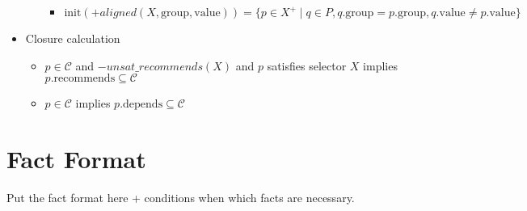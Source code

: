 \documentclass[a4paper,english]{article}
\begin{document}
\begin{itemize}
\begin{itemize}
\begin{itemize}
          \item $\mathrm{init}({+}\mathit{aligned}(X,\mathrm{group},\mathrm{value}))=\{p\in X^{+}\mid q\in P, q.\mathrm{group} = p.\mathrm{group}, q.\mathrm{value} \neq p.\mathrm{value}\}$
        \end{itemize}
    \end{itemize}
  \item Closure calculation
    \begin{itemize}
      \item $p\in \mathcal{C}$ and ${-}\mathit{unsat\_recommends}(X)$ and $p$ satisfies selector $X$ implies $p.\mathrm{recommends}\subseteq\mathcal{C}$
      \item $p\in \mathcal{C}$ implies $p.\mathrm{depends}\subseteq\mathcal{C}$
    \end{itemize}
\end{itemize}

\section{Fact Format}

Put the fact format here + conditions when which facts are necessary.
\end{document}
